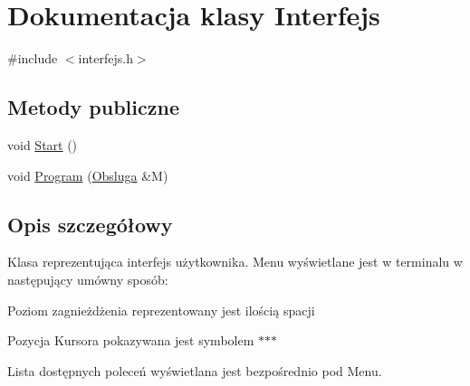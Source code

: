 \hypertarget{classInterfejs}{\section{Dokumentacja klasy Interfejs}
\label{classInterfejs}
}


{\ttfamily \#include $<$interfejs.\-h$>$}

\subsection*{Metody publiczne}
\begin{DoxyCompactItemize}
\item 
void \hyperlink{classInterfejs_ab016a2fdc6ba2553378167d6a07f8ea3}{Start} ()
\item 
void \hyperlink{classInterfejs_a46d175ac6f4e02e5e60fea8bb54c98b7}{Program} (\hyperlink{classObsluga}{Obsluga} \&M)
\end{DoxyCompactItemize}


\subsection{Opis szczegółowy}
Klasa reprezentująca interfejs użytkownika. Menu wyświetlane jest w terminalu w następujący umówny sposób\-:
\begin{DoxyItemize}
\item Poziom zagnieżdżenia reprezentowany jest ilością spacji
\item Pozycja Kursora pokazywana jest symbolem $\ast$$\ast$$\ast$
\item Lista dostępnych poleceń wyświetlana jest bezpośrednio pod Menu. 
\end{DoxyItemize}

